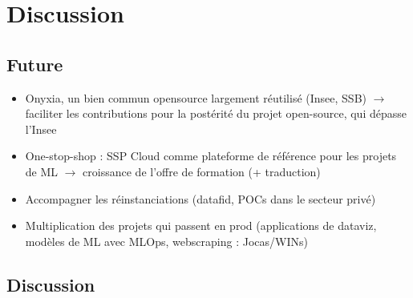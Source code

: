 \section{Discussion}

\subsection{Future}

\begin{itemize}
    \item Onyxia, un bien commun opensource largement réutilisé (Insee, SSB) $\rightarrow$ faciliter les contributions pour la postérité du projet open-source, qui dépasse l'Insee
    \item One-stop-shop : SSP Cloud comme plateforme de référence pour les projets de ML $\rightarrow$ croissance de l'offre de formation (+ traduction)
    \item Accompagner les réinstanciations (datafid, POCs dans le secteur privé)
    \item Multiplication des projets qui passent en prod (applications de dataviz, modèles de ML avec MLOps, webscraping : Jocas/WINs)
\end{itemize}

\subsection{Discussion}

